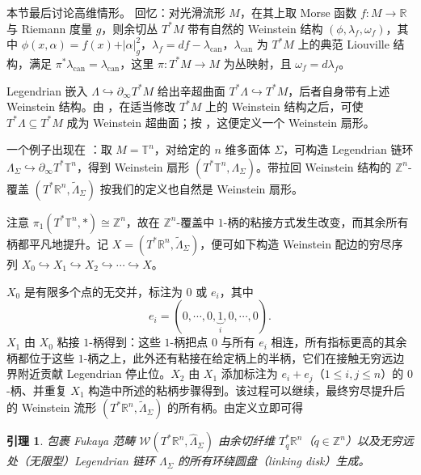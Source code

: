 \documentclass[11pt,a4paper]{article}
\DeclareMathOperator*{\can}{\mathrm{can}}
\theoremstyle{cnth}
\newtheorem{lmm}[thm]{引理}
\begin{document}
本节最后讨论高维情形。
回忆：对光滑流形 $M$，在其上取 Morse 函数 $f\colon M\to\mathbb{R}$ 与 Riemann 度量 $g$，则余切丛 $T^{\ast} M$ 带有自然的 Weinstein 结构 $(\phi,\lambda_f,\omega_f)$，其中 $\phi (x,\alpha) =f(x)+\vert\alpha\vert_g^2$，$\lambda_f =df-\lambda_{\can}$，$\lambda_{\can}$ 为 $T^{\ast} M$ 上的典范 Liouville 结构，满足 $\pi^{\ast}\lambda_{\can} =\lambda_{\can}$，这里 $\pi\colon T^{\ast} M\to M$ 为丛映射，且 $\omega_f =d\lambda_f$。\par
    Legendrian 嵌入 $\Lambda\hookrightarrow\partial_{\infty} T^{\ast} M$ 给出辛超曲面 $T^{\ast}\Lambda\hookrightarrow T^{\ast} M$，后者自身带有上述 Weinstein 结构。由 \cite{Eliashberg18}，在适当修改 $T^{\ast} M$ 上的 Weinstein 结构之后，可使 $T^{\ast}\Lambda\subseteq T^{\ast} M$ 成为 Weinstein 超曲面；按 \cite{GPS20}，这便定义一个 Weinstein 扇形。\par
    一个例子出现在 \cite{FLTZ12}：取 $M=\mathbb{T}^n$，对给定的 $n$ 维多面体 $\Sigma$，可构造 Legendrian 链环 $\Lambda_{\Sigma}\hookrightarrow\partial_{\infty} T^{\ast}\mathbb{T}^n$，得到 Weinstein 扇形 $(T^{\ast}\mathbb{T}^n,\Lambda_{\Sigma})$。带拉回 Weinstein 结构的 $\mathbb{Z}^n$-覆盖 $(T^{\ast}\mathbb{R}^n,\widetilde{\Lambda}_{\Sigma})$ 按我们的定义也自然是 Weinstein 扇形。\par
    注意 $\pi_1 (T^{\ast}\mathbb{T}^n,\ast)\cong\mathbb{Z}^n$，故在 $\mathbb{Z}^n$-覆盖中 $1$-柄的粘接方式发生改变，而其余所有柄都平凡地提升。记 $X=(T^{\ast}\mathbb{R}^n,\widetilde{\Lambda}_{\Sigma})$，便可如下构造 Weinstein 配边的穷尽序列 $X_0\hookrightarrow X_1\hookrightarrow X_2\hookrightarrow\dotsb\hookrightarrow X$。\par
    $X_0$ 是有限多个点的无交并，标注为 $0$ 或 $e_i$，其中
\[
    e_i =(0,\dotsb ,0,\underbrace{1}_i,0,\dotsb ,0).
\]
$X_1$ 由 $X_0$ 粘接 $1$-柄得到：这些 $1$-柄把点 $0$ 与所有 $e_i$ 相连，所有指标更高的其余柄都位于这些 $1$-柄之上，此外还有粘接在给定柄上的半柄，它们在接触无穷远边界附近贡献 Legendrian 停止位。$X_2$ 由 $X_1$ 添加标注为 $e_i+e_j$（$1\leq i,j\leq n$）的 $0$-柄、并重复 $X_1$ 构造中所述的粘柄步骤得到。该过程可以继续，最终穷尽提升后的 Weinstein 流形 $(T^{\ast}\mathbb{R}^n,\widetilde{\Lambda}_{\Sigma})$ 的所有柄。由定义立即可得
\begin{lmm}\label{lmm:Fukaya-category-Gmn-equivariant-generation}
    包裹 Fukaya 范畴 $\mathcal{W} (T^{\ast}\mathbb{R}^n,\widehat{\Lambda}_{\Sigma})$ 由余切纤维 $T^{\ast}_q\mathbb{R}^n$（$q\in\mathbb{Z}^n$）以及无穷远处（无限型）Legendrian 链环 $\Lambda_{\Sigma}$ 的所有环绕圆盘（linking disk）生成。
\end{lmm}
\end{document}
